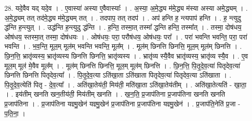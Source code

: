 \documentclass[17pt]{extarticle}
\begin{document}
28. यदे॒वैव यद् यदे॒व । . ए॒वास्या॑ अस्या ए॒वैवास्याः᳚ । . अ॒स्या॒ अ॒मे॒द्ध्य म॑मे॒द्ध्य म॑स्या अस्या अमे॒द्ध्यम् । . अ॒मे॒द्ध्यम् तत् तद॑मे॒द्ध्य म॑मे॒द्ध्यम् तत् । . तदपाप॒ तत् तदप॑ । . अप॑ हन्ति ह॒ न्त्यपाप॑ हन्ति । . ह॒ न्त्युदु द्ध॑न्ति ह॒न्त्युत् । . उद्ध॑न्ति ह॒न्त्युदु द्ध॑न्ति । . ह॒न्ति॒ तस्मा॒त् तस्मा᳚ द्धन्ति हन्ति॒ तस्मा᳚त् । . तस्मा॒ दोष॑धय॒ ओष॑धय॒ स्तस्मा॒त् तस्मा॒ दोष॑धयः । . ओष॑धयः॒ परा॒ परौष॑धय॒ ओष॑धयः॒ परा᳚ । . परा॑ भवन्ति भवन्ति॒ परा॒ परा॑ भवन्ति । . भ॒व॒न्ति॒ मूल॒म् मूल॑म् भवन्ति भवन्ति॒ मूल᳚म् । . मूल॑म् छिनत्ति छिनत्ति॒ मूल॒म् मूल॑म् छिनत्ति । . छि॒न॒त्ति॒ भ्रातृ॑व्यस्य॒ भ्रातृ॑व्यस्य छिनत्ति छिनत्ति॒ भ्रातृ॑व्यस्य । . भ्रातृ॑व्य स्यै॒वैव भ्रातृ॑व्यस्य॒ भ्रातृ॑व्य स्यै॒व । . ए॒व मूल॒म् मूल॑ मे॒वैव मूल᳚म् । . मूल॑म् छिनत्ति छिनत्ति॒ मूल॒म् मूल॑म् छिनत्ति । . छि॒न॒त्ति॒ पि॒तृ॒दे॒व॒त्या॑ पितृदेव॒त्या॑ छिनत्ति छिनत्ति पितृदेव॒त्या᳚ । . पि॒तृ॒दे॒व॒त्या ऽति॑खा॒ता ऽति॑खाता पितृदेव॒त्या॑ 
पितृदेव॒त्या ऽति॑खाता । . पि॒तृ॒दे॒व॒त्येति॑ पितृ - दे॒व॒त्या᳚ । . अति॑खा॒तेय॑ती॒ मिय॑ती॒ मति॑खा॒ता ऽति॑खा॒तेय॑तीम् । . अति॑खा॒तेत्यति॑ - खा॒ता॒ । . इय॑तीम् खनति खन॒तीय॑ती॒ मिय॑तीम् खनति । . ख॒न॒ति॒ प्र॒जाप॑तिना प्र॒जाप॑तिना खनति खनति प्र॒जाप॑तिना । . प्र॒जाप॑तिना यज्ञ्मु॒खेन॑ यज्ञ्मु॒खेन॑ प्र॒जाप॑तिना प्र॒जाप॑तिना यज्ञ्मु॒खेन॑ । . प्र॒जाप॑ति॒नेति॑ प्र॒जा - प॒ति॒ना॒ । \newline
\end{document}
